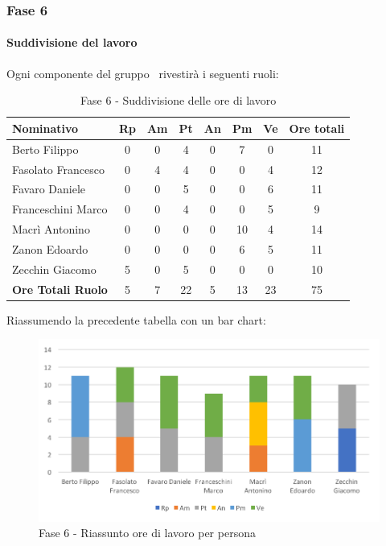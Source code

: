 \documentclass[../PianoDiProgetto.tex]{subfiles}
\begin{document}
		\newpage
		\subsubsection{Fase 6}
			\paragraph{Suddivisione del lavoro}
			Ogni componente del gruppo \kpanic\ rivestirà i seguenti ruoli:
			\begin{table}[h]
				\begin{tabularx}{\textwidth}{l * {6}{C} c}
				\toprule
				\textbf{Nominativo} & \textbf{Rp} & \textbf{Am} & \textbf{Pt} & \textbf{An} & \textbf{Pm} & \textbf{Ve} & \textbf{Ore totali} \\
				\midrule
				Berto Filippo &	0 & 0 & 4 & 0 & 7 & 0 & 11 \\
				Fasolato Francesco & 0 & 4 & 4 & 0 & 0 & 4 & 12 \\
				Favaro Daniele & 0 & 0 & 5 & 0 & 0 & 6 & 11 \\
				Franceschini Marco & 0& 0 & 4 & 0 & 0 & 5 & 9 \\
				Macrì Antonino & 0 & 0 & 0 & 0 & 10 & 4 & 14 \\
				Zanon Edoardo &	0 &0 & 0 & 0 & 6 & 5 & 11 \\
				Zecchin Giacomo & 5 & 0 & 5 & 0 & 0 & 0 & 10 \\
				\midrule			
				\textbf{Ore Totali Ruolo} & 5 & 7 & 22 & 5 & 13 & 23 & 75 \\
				\bottomrule
				\end{tabularx}
				\caption{Fase 6 - Suddivisione delle ore di lavoro}		
			\end{table}
			
			Riassumendo la precedente tabella con un bar chart:	
			\begin{figure}[!h]
				\centering
				\includegraphics[width=\textwidth]{Preventivo/Immagini/fase6_oreRuoloPersona.png}
				\caption{Fase 6 - Riassunto ore di lavoro per persona}
			\end{figure}	
\end{document}
